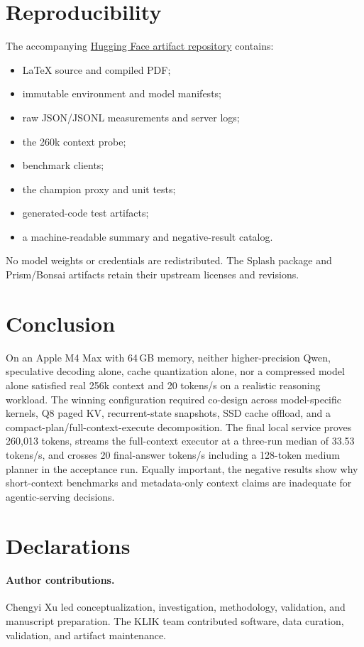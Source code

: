 \documentclass[11pt]{article}
\begin{document}
\section{Reproducibility}
The accompanying \href{https://huggingface.co/datasets/ChengyiX/260k-wall}{Hugging Face artifact repository} contains:
\begin{itemize}[leftmargin=1.6em]
\item LaTeX source and compiled PDF;
\item immutable environment and model manifests;
\item raw JSON/JSONL measurements and server logs;
\item the 260k context probe;
\item benchmark clients;
\item the champion proxy and unit tests;
\item generated-code test artifacts;
\item a machine-readable summary and negative-result catalog.
\end{itemize}
No model weights or credentials are redistributed. The Splash package and Prism/Bonsai artifacts retain their upstream licenses and revisions.

\section{Conclusion}
On an Apple M4 Max with 64\,GB memory, neither higher-precision Qwen, speculative decoding alone, cache quantization alone, nor a compressed model alone satisfied real 256k context and 20 tokens/s on a realistic reasoning workload. The winning configuration required co-design across model-specific kernels, Q8 paged KV, recurrent-state snapshots, SSD cache offload, and a compact-plan/full-context-execute decomposition. The final local service proves 260{,}013 tokens, streams the full-context executor at a three-run median of 33.53 tokens/s, and crosses 20 final-answer tokens/s including a 128-token medium planner in the acceptance run. Equally important, the negative results show why short-context benchmarks and metadata-only context claims are inadequate for agentic-serving decisions.

\section*{Declarations}
\paragraph{Author contributions.} Chengyi Xu led conceptualization, investigation, methodology, validation, and manuscript preparation. The KLIK team contributed software, data curation, validation, and artifact maintenance.
\end{document}
